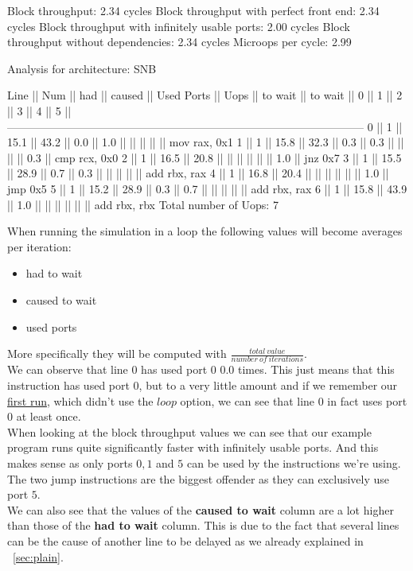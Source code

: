 \begin{example}
Block throughput: 2.34 cycles
Block throughput with perfect front end: 2.34 cycles
Block throughput with infinitely usable ports: 2.00 cycles
Block throughput without dependencies: 2.34 cycles
Microops per cycle: 2.99

Analysis for architecture: SNB

 Line  ||   Num   ||   had   || caused  ||            Used Ports
       ||   Uops  || to wait || to wait ||   0   ||   1   ||   2   ||   3   ||   4   ||   5   ||
 ------------------------------------------------------------------------------------------------
   0   ||    1    ||  15.1   ||  43.2   ||  0.0  ||  1.0  ||       ||       ||       ||       || mov rax, 0x1
   1   ||    1    ||  15.8   ||  32.3   ||  0.3  ||  0.3  ||       ||       ||       ||  0.3  || cmp rcx, 0x0
   2   ||    1    ||  16.5   ||  20.8   ||       ||       ||       ||       ||       ||  1.0  || jnz 0x7
   3   ||    1    ||  15.5   ||  28.9   ||  0.7  ||  0.3  ||       ||       ||       ||       || add rbx, rax
   4   ||    1    ||  16.8   ||  20.4   ||       ||       ||       ||       ||       ||  1.0  || jmp 0x5
   5   ||    1    ||  15.2   ||  28.9   ||  0.3  ||  0.7  ||       ||       ||       ||       || add rbx, rax
   6   ||    1    ||  15.8   ||  43.9   ||  1.0  ||       ||       ||       ||       ||       || add rbx, rbx
Total number of Uops: 7
\end{example}

When running the simulation in a loop the following values will become averages per iteration:

\begin{itemize}
    \item had to wait
    \item caused to wait
    \item used ports
\end{itemize} 

More specifically they will be computed with $\frac{total\ value}{number\ of\ iterations}$.\\
We can observe that line $0$ has used port $0$ $0.0$ times. This just means that this instruction has used port $0$, but to a very little amount and if we remember our \hyperref[sec:plain]{first run}, which didn't use the $loop$ option, we can see that line $0$ in fact uses port $0$ at least once.\\
When looking at the block throughput values we can see that our example program runs quite significantly faster with infinitely usable ports. And this makes sense as only ports $0, 1$ and $5$ can be used by the instructions we're using. The two jump instructions are the biggest offender as they can exclusively use port $5$.\\
We can also see that the values of the \textbf{caused to wait} column are a lot higher than those of the \textbf{had to wait} column. This is due to the fact that several lines can be the cause of another line to be delayed as we already explained in ~\autoref{sec:plain}.

